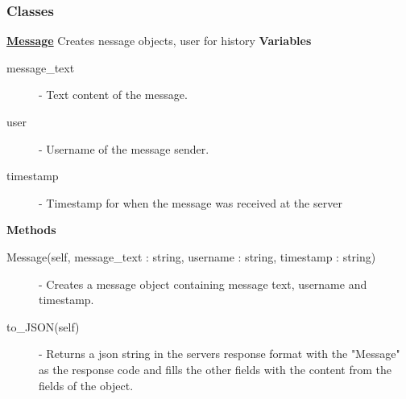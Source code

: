 \documentclass[a4paper, 12pt]{article}
\begin{document}
        \subsubsection{Classes}
            \textbf{\underline{Message}}
            \newline
            \newline
                Creates nessage objects, user for history
                \newline
                \newline
                \textbf{Variables}
                    \begin{description}
                        \item[message\_text] - Text content of the message.
                        \item[user] - Username of the message sender.
                        \item[timestamp] - Timestamp for when the message was received at the server
                    \end{description}
                \textbf{Methods}
                    \begin{description}
                        \item[Message(self, message\_text : string, username : string, timestamp : string)] - Creates a message object containing message text, username and timestamp.
                        \item[to\_JSON(self)] - Returns a json string in the servers response format with the "Message" as the response code and fills the other fields with the content from the fields of the object.
                    \end{description}
\end{document}
